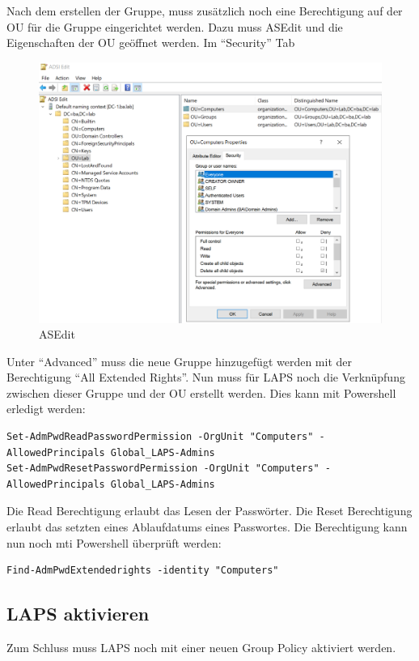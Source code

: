 Nach dem erstellen der Gruppe, muss zusätzlich noch eine Berechtigung auf der OU für die Gruppe eingerichtet werden.
Dazu muss ASEdit und die Eigenschaften der OU geöffnet werden. Im ``Security'' Tab
\begin{figure}[H]
    \centering
    \includegraphics[width=0.7\linewidth]{../img/LAPS/ASEdit.png}
    \caption{ASEdit}
\end{figure}


Unter ``Advanced'' muss die neue Gruppe hinzugefügt werden mit der Berechtigung ``All Extended Rights''.
Nun muss für LAPS noch die Verknüpfung zwischen dieser Gruppe und der OU erstellt werden.
Dies kann mit Powershell erledigt werden:
\begin{lstlisting}
Set-AdmPwdReadPasswordPermission -OrgUnit "Computers" -AllowedPrincipals Global_LAPS-Admins
Set-AdmPwdResetPasswordPermission -OrgUnit "Computers" -AllowedPrincipals Global_LAPS-Admins
\end{lstlisting}
Die Read Berechtigung erlaubt das Lesen der Passwörter.
Die Reset Berechtigung erlaubt das setzten eines Ablaufdatums eines Passwortes.
Die Berechtigung kann nun noch mti Powershell überprüft werden:
\begin{lstlisting}
Find-AdmPwdExtendedrights -identity "Computers"
\end{lstlisting}


\subsection{LAPS aktivieren}
Zum Schluss muss LAPS noch mit einer neuen Group Policy aktiviert werden.


